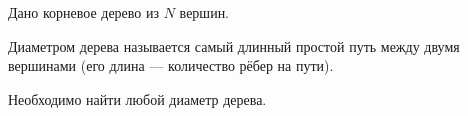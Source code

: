 Дано корневое дерево из $N$ вершин.

Диаметром дерева называется самый длинный простой путь между двумя вершинами (его длина --- количество рёбер на пути).

Необходимо найти любой диаметр дерева.
